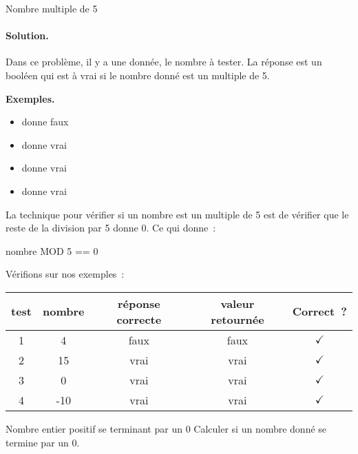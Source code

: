 \begin{Exercice}{Nombre multiple de 5}
			\paragraph{Solution.}
			Dans ce problème,
			il y a une donnée, le nombre à tester.
			La réponse est un booléen
			qui est à vrai si le nombre donné est un multiple de 5.
			\begin{center}
			\end{center}
			\textbf{Exemples.}
			\begin{multicols}{4}
				\begin{itemize}
					\item {} donne faux
					\item {} donne vrai
					\item {} donne vrai
					\item {} donne vrai
				\end{itemize}
			\end{multicols}
			La technique pour vérifier si un nombre est
			un multiple de 5 est de vérifier que le reste
			de la division par 5 donne 0.
			Ce qui donne~:
			\begin{pseudocode}[1]
				\Return nombre MOD 5 == 0
			\EndAlgo
		\end{pseudocode}
		Vérifions sur nos exemples~:
		\begin{center}
			\begin{tabular}{|c|c|c|c|c|}
				\hline
				test \no & nombre & réponse correcte & valeur retournée & Correct~? \\\hline
				\hline 
				1 & 4   & faux & faux & {\color{ForestGreen}$\checkmark$} \\\hline
				2 & 15  & vrai & vrai & {\color{ForestGreen}$\checkmark$} \\\hline
				3 & 0   & vrai & vrai & {\color{ForestGreen}$\checkmark$} \\\hline
				4 & -10 & vrai & vrai & {\color{ForestGreen}$\checkmark$} \\\hline
			\end{tabular}
		\end{center}
	\end{Exercice}

	\begin{Exercice}{Nombre entier positif se terminant par un 0}
		Calculer si un nombre donné se termine par un 0.
	\end{Exercice}

